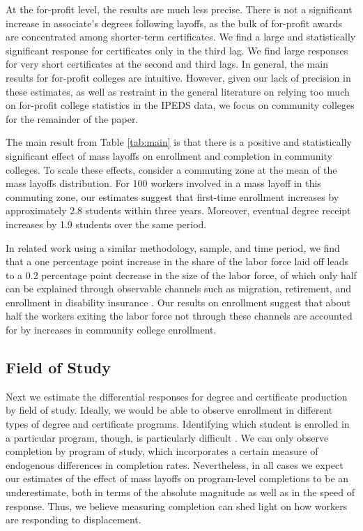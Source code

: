 At the for-profit level, the results are much less precise. There is not a significant increase in associate's degrees following layoffs, as the bulk of for-profit awards are concentrated among shorter-term certificates. We find a large and statistically significant response for certificates only in the third lag. We find large responses for very short certificates at the second and third lags. In general, the main results for for-profit colleges are intuitive. However, given our lack of precision in these estimates, as well as restraint in the general literature on relying too much on for-profit college statistics in the IPEDS data, we focus on community colleges for the remainder of the paper. 

The main result from Table \ref{tab:main} is that there is a positive and statistically significant effect of mass layoffs on enrollment and completion in community colleges. To scale these effects, consider a commuting zone at the mean of the mass layoffs distribution. For 100 workers involved in a mass layoff in this commuting zone, our estimates suggest that first-time enrollment increases by approximately 2.8 students within three years. Moreover, eventual degree receipt increases by 1.9 students over the same period. 

In related work using a similar methodology, sample, and time period, we find that a one percentage point increase in the share of the labor force laid off leads to a 0.2 percentage point decrease in the size of the labor force, of which only half can be explained through observable channels such as migration, retirement, and enrollment in disability insurance \citep{FGS2015}. Our results on enrollment suggest that about half the workers exiting the labor force not through these channels are accounted for by increases in community college enrollment. 


\subsection{Field of Study}
Next we estimate the differential responses for degree and certificate production by field of study. Ideally, we would be able to observe enrollment in different types of degree and certificate programs. Identifying which student is enrolled in a particular program, though, is particularly difficult \citep{BSZ2015}. We can only observe completion by program of study, which incorporates a certain measure of endogenous differences in completion rates. Nevertheless, in all cases we expect our estimates of the effect of mass layoffs on program-level completions to be an underestimate, both in terms of the absolute magnitude as well as in the speed of response. Thus, we believe measuring completion can shed light on how workers are responding to displacement.

